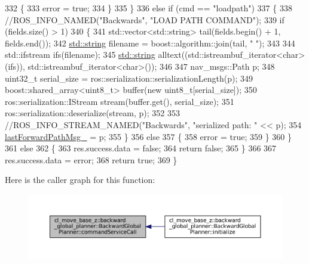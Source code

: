 \begin{DoxyCode}
332         \{
333             error = \textcolor{keyword}{true};
334         \}
335     \}
336     \textcolor{keywordflow}{else} \textcolor{keywordflow}{if} (cmd == \textcolor{stringliteral}{"loadpath"})
337     \{
338         \textcolor{comment}{//ROS\_INFO\_NAMED("Backwards", "LOAD PATH COMMAND");}
339         \textcolor{keywordflow}{if} (fields.size() > 1)
340         \{
341             std::vector<std::string> tail(fields.begin() + 1, fields.end());
342             \hyperlink{namespacetesting_1_1internal_a8e8ff5b11e64078831112677156cb111}{std::string} filename = boost::algorithm::join(tail, \textcolor{stringliteral}{" "});
343 
344             std::ifstream ifs(filename);
345             \hyperlink{namespacetesting_1_1internal_a8e8ff5b11e64078831112677156cb111}{std::string} alltext((std::istreambuf\_iterator<char>(ifs)), 
      std::istreambuf\_iterator<char>());
346 
347             nav\_msgs::Path p;
348             uint32\_t serial\_size = ros::serialization::serializationLength(p);
349             boost::shared\_array<uint8\_t> buffer(\textcolor{keyword}{new} uint8\_t[serial\_size]);
350             ros::serialization::IStream stream(buffer.get(), serial\_size);
351             ros::serialization::deserialize(stream, p);
352 
353             \textcolor{comment}{//ROS\_INFO\_STREAM\_NAMED("Backwards", "serialized path: " << p);}
354             \hyperlink{classcl__move__base__z_1_1backward__global__planner_1_1BackwardGlobalPlanner_a149ee7d22d98271c9ee1da55241d500b}{lastForwardPathMsg\_} = p;
355         \}
356         \textcolor{keywordflow}{else}
357         \{
358             error = \textcolor{keyword}{true};
359         \}
360     \}
361     \textcolor{keywordflow}{else}
362     \{
363         res.success.data = \textcolor{keyword}{false};
364         \textcolor{keywordflow}{return} \textcolor{keyword}{false};
365     \}
366 
367     res.success.data = error;
368     \textcolor{keywordflow}{return} \textcolor{keyword}{true};
369 \}
\end{DoxyCode}
Here is the caller graph for this function\+:
\nopagebreak
\begin{figure}[H]
\begin{center}
\leavevmode
\includegraphics[width=350pt]{classcl__move__base__z_1_1backward__global__planner_1_1BackwardGlobalPlanner_a399a3dd0a3f8c781be06158e3238a5d9_icgraph}
\end{center}
\end{figure}
